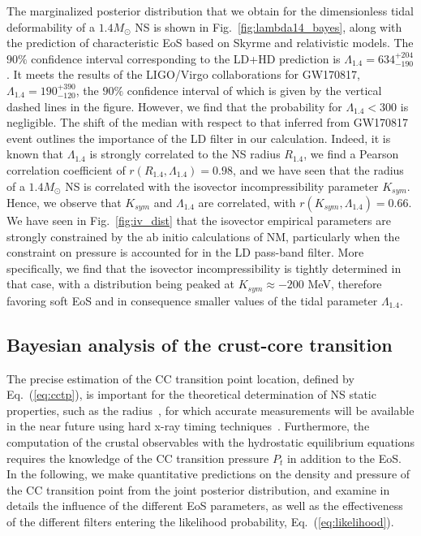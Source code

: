 The marginalized posterior distribution that we obtain for the dimensionless 
tidal deformability of a $1.4M_\odot$ NS is shown in 
Fig.~\ref{fig:lambda14_bayes}, along with the prediction of characteristic EoS
based on Skyrme and relativistic models. The $90\%$ confidence interval
corresponding to the LD+HD prediction is $\Lambda_{1.4}=634_{-190}^{+204}$. It 
meets the results of the LIGO/Virgo collaborations for GW170817, 
$\Lambda_{1.4}=190_{-120}^{+390}$, the $90\%$ confidence interval of which is 
given by the vertical dashed lines in the figure. 
However, we find that the probability for $\Lambda_{1.4} < 300$ is 
negligible. The shift of the median with respect to that inferred from
GW170817 event outlines the importance of the LD filter in our calculation.
Indeed, it is known that $\Lambda_{1.4}$ is strongly correlated to the NS
radius $R_{1.4}$, we find a Pearson correlation coefficient of $r(R_{1.4},
\Lambda_{1.4})=0.98$, and we have seen that the radius of a $1.4M_\odot$ NS is 
correlated with the isovector incompressibility parameter $K_{sym}$. Hence, 
we observe that $K_{sym}$ and $\Lambda_{1.4}$ are correlated, with
$r(K_{sym},\Lambda_{1.4}) = 0.66$. We have seen in Fig.~\ref{fig:iv_dist} that 
the isovector empirical parameters are strongly constrained by the ab initio 
calculations of NM, particularly when the constraint on pressure is accounted 
for in the LD pass-band filter. More specifically, we find that the 
isovector incompressibility is tightly determined in that case, with a 
distribution being peaked at $K_{sym} \approx -200$ MeV, therefore favoring 
soft EoS and in consequence smaller values of the tidal parameter 
$\Lambda_{1.4}$.
%


\subsection{Bayesian analysis of the crust-core
transition}\label{subsec:cc_bayes}

The precise estimation of the CC transition point location, defined by
Eq.~(\ref{eq:cctp}), is important for the theoretical determination of NS 
static properties, such as the radius~\cite{Fortin2016}, for which accurate 
measurements will be available in the near future using hard x-ray timing 
techniques~\cite{Watts2016}. 
Furthermore, the computation of the crustal observables with the hydrostatic 
equilibrium equations requires the knowledge of the CC transition pressure 
$P_t$ in addition to the EoS. 
In the following, we make quantitative predictions on the density and
pressure of the CC transition point from the joint posterior distribution, and 
examine in details the influence of the different EoS parameters, as well as 
the effectiveness of the different filters entering the likelihood 
probability, Eq.~(\ref{eq:likelihood}).

